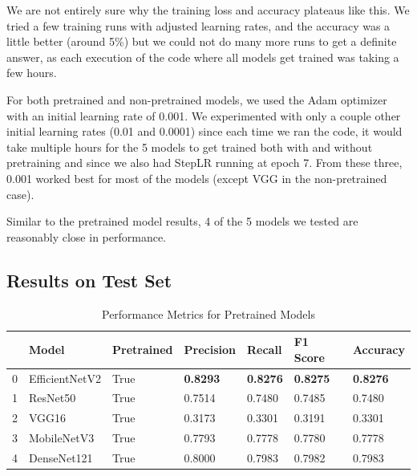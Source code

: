 \documentclass{article}
\begin{document}
We are not entirely sure why the training loss and accuracy plateaus like this. We tried a few training runs with adjusted learning rates, and the accuracy was a little better (around 5\%) but we could not do many more runs to get a definite answer, as each execution of the code where all models get trained was taking a few hours.

For both pretrained and non-pretrained models, we used the Adam optimizer with an initial learning rate of 0.001. We experimented with only a couple other initial learning rates (0.01 and 0.0001) since each time we ran the code, it would take multiple hours for the 5 models to get trained both with and without pretraining and since we also had StepLR running at epoch 7. From these three, 0.001 worked best for most of the models (except VGG in the non-pretrained case).

Similar to the pretrained model results, 4 of the 5 models we tested are reasonably close in performance.

\subsection*{Results on Test Set}
\begin{table}[!ht]
    \centering
    \caption{Performance Metrics for Pretrained Models}
    \begin{tabular}{|l|l|l|l|l|l|l|}
        \hline
        \textbf{} & \textbf{Model} & \textbf{Pretrained} & \textbf{Precision} & \textbf{Recall} & \textbf{F1 Score} & \textbf{Accuracy} \\ \hline
        0 & EfficientNetV2 & True & \textbf{0.8293} & \textbf{0.8276} & \textbf{0.8275} & \textbf{0.8276} \\ \hline
        1 & ResNet50 & True & 0.7514 & 0.7480 & 0.7485 & 0.7480 \\ \hline
        2 & VGG16 & True & 0.3173 & 0.3301 & 0.3191 & 0.3301 \\ \hline
        3 & MobileNetV3 & True & 0.7793 & 0.7778 & 0.7780 & 0.7778 \\ \hline
        4 & DenseNet121 & True & 0.8000 & 0.7983 & 0.7982 & 0.7983 \\ \hline
    \end{tabular}
\end{table}
\end{document}

